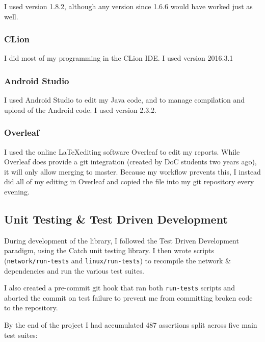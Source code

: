 \documentclass[a4paper]{article}
\begin{document}
I used version 1.8.2, although any version since 1.6.6 would have worked just as well.

\subsubsection{CLion}

I did most of my programming in the CLion\cite{ppref19} IDE. I used version 2016.3.1 

\subsubsection{Android Studio}

I used Android Studio\cite{ppref20} to edit my Java code, and to manage compilation and upload of the Android code. I used version 2.3.2.

\subsubsection{Overleaf}%
\label{subsubsec:pp_ts_overleaf}

I used the online \LaTeX editing software Overleaf\cite{ppref21} to edit my reports. While Overleaf does provide a git integration (created by DoC students two years ago), it will only allow merging to master. Because my workflow prevents this, I instead did all of my editing in Overleaf and copied the file into my git repository every evening.

\subsection{Unit Testing \& Test Driven Development}%
\label{subsec:pp_testing}

During development of the library, I followed the Test Driven Development paradigm, using the Catch\cite{ppref6} unit testing library. I then wrote scripts (\lstinline{network/run-tests} and \lstinline{linux/run-tests}) to recompile the network \& dependencies and run the various test suites. 

I also created a pre-commit git hook that ran both \lstinline{run-tests} scripts and aborted the commit on test failure to prevent me from committing broken code to the repository.

By the end of the project I had accumulated 487 assertions split across five main test suites:
\end{document}
